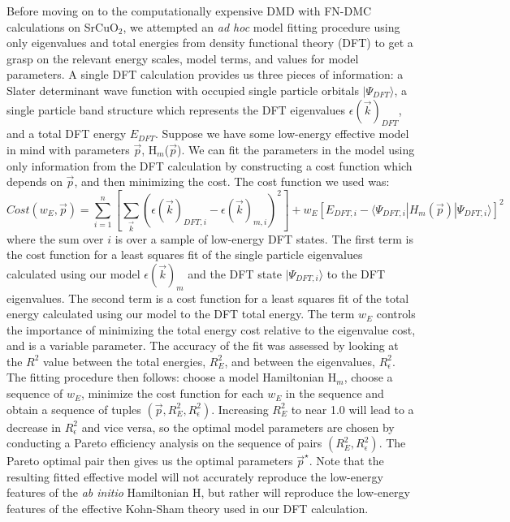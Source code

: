 \documentclass{article}
\begin{document}
Before moving on to the computationally expensive DMD with FN-DMC calculations on SrCuO$_2$, we attempted an \textit{ad hoc} model fitting procedure using only eigenvalues and total energies from density functional theory (DFT) to get a grasp on the relevant energy scales, model terms, and values for model parameters. A single DFT calculation provides us three pieces of information: a Slater determinant wave function with occupied single particle orbitals $|\Psi_{DFT}\rangle$, a single particle band structure which represents the DFT eigenvalues $\epsilon(\vec{k})_{DFT}$, and a total DFT energy $E_{DFT}$. Suppose we have some low-energy effective model in mind with parameters $\vec{p}$, H$_m$($\vec{p}$). We can fit the parameters in the model using only information from the DFT calculation by constructing a cost function which depends on $\vec{p}$, and then minimizing the cost. The cost function we used was:
\begin{equation}
Cost(w_E, \vec{p}) = \sum_{i=1}^{n} [\sum_{\vec{k}}(\epsilon(\vec{k})_{DFT,i} - \epsilon(\vec{k})_{m,i})^2] + w_E[E_{DFT,i} - \langle \Psi_{DFT,i}|H_m(\vec{p})| \Psi_{DFT,i} \rangle]^2
\end{equation}
where the sum over $i$ is over a sample of low-energy DFT states. The first term is the cost function for a least squares fit of the single particle eigenvalues calculated using our model $\epsilon(\vec{k})_m$ and the DFT state $|\Psi_{DFT,i}\rangle$ to the DFT eigenvalues. The second term is a cost function for a least squares fit of the total energy calculated using our model to the DFT total energy. The term $w_E$ controls the importance of minimizing the total energy cost relative to the eigenvalue cost, and is a variable parameter. The accuracy of the fit was assessed by looking at the $R^2$ value between the total energies, $R^2_E$, and between the eigenvalues, $R^2_\epsilon$. The fitting procedure then follows: choose a model Hamiltonian H$_m$, choose a sequence of $w_E$, minimize the cost function for each $w_E$ in the sequence and obtain a sequence of tuples $(\vec{p}, R^2_E, R^2_\epsilon)$. Increasing $R^2_E$ to near 1.0 will lead to a decrease in $R^2_\epsilon$ and vice versa, so the optimal model parameters are chosen by conducting a Pareto efficiency analysis on the sequence of pairs $(R^2_E, R^2_\epsilon)$. The Pareto optimal pair then gives us the optimal parameters $\vec{p}^\star$. Note that the resulting fitted effective model will not accurately reproduce the low-energy features of the \textit{ab initio} Hamiltonian H, but rather will reproduce the low-energy features of the effective Kohn-Sham theory used in our DFT calculation.
\end{document}
